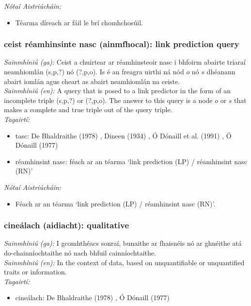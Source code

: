  \noindent \textit{Nótaí Aistriúcháin:}
\begin{itemize}
	\item Téarma díreach ar fáil le brí chomhchosúil.
\end{itemize}


\subsubsection*{ceist réamhinsinte nasc (ainmfhocal): link prediction query}
 \noindent \textit{Sainmhíniú (ga):} Ceist a chuirtear ar réamhinsteoir nasc i bhfoirm abairte triaraí neamhiomlán (s,p,?) nó (?,p,o). Is é an freagra uirthi ná nód $o$ nó $s$ dhéanann abairt iomlán agus cheart as abairt neamhiomlán na ceiste.
\\
 \noindent \textit{Sainmhíniú (en):} A query that is posed to a link predictor in the form of an incomplete triple (s,p,?) or (?,p,o). The answer to this query is a node $o$ or $s$ that makes a complete and true triple out of the query triple.
\\
 \noindent \textit{Tagairtí:}
\begin{itemize}
	\item tasc: De Bhaldraithe (1978) \cite{de-bhaldraithe}, Dineen (1934) \cite{dineen}, Ó Dónaill et al. (1991) \cite{focloir-beag}, Ó Dónaill (1977) \cite{odonaill}
	\item réamhinsint nasc: féach ar an téarma `link prediction (LP) / réamhinsint nasc (RN)'
\end{itemize}

 \noindent \textit{Nótaí Aistriúcháin:}
\begin{itemize}
	\item Féach ar an téarma `link prediction (LP) / réamhinsint nasc (RN)'.
\end{itemize}


\subsubsection*{cineálach (aidiacht): qualitative}
 \noindent \textit{Sainmhíniú (ga):} I gcomhthéacs sonraí, bunaithe ar fhaisnéis nó ar ghnéithe atá do-chainníochtaithe nó nach bhfuil cainníochtaithe.
\\
 \noindent \textit{Sainmhíniú (en):} In the context of data, based on unquantifiable or unquantified traits or information.
\\
 \noindent \textit{Tagairtí:}
\begin{itemize}
	\item cineálach: De Bhaldraithe (1978) \cite{de-bhaldraithe}, Ó Dónaill (1977) \cite{odonaill}
\end{itemize}

